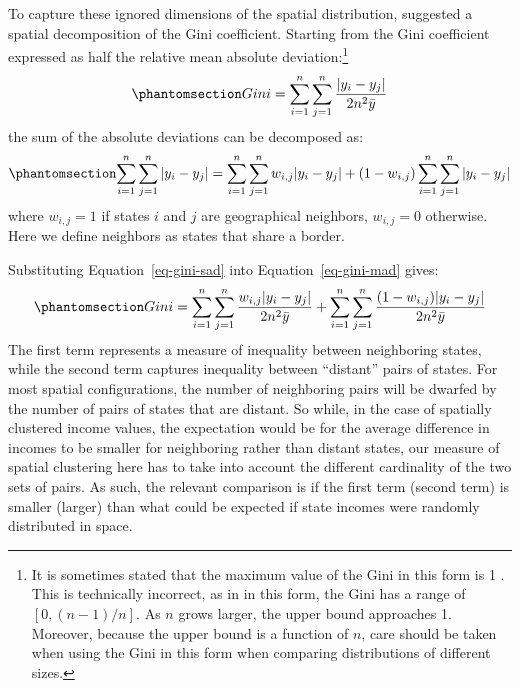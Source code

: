 \documentclass[
  a4paper, 
  twoside,
  final
]{article}
\begin{document}
To capture these ignored dimensions of the spatial distribution,
\citet{rey2013SpatialDecomposition} suggested a spatial decomposition of
the Gini coefficient. Starting from the Gini coefficient expressed as
half the relative mean absolute deviation:\footnote{It is sometimes
  stated that the maximum value of the Gini in this form is 1
  \citep[e.g.,][]{wang2024RobustMethod}. This is technically incorrect,
  as in in this form, the Gini has a range of \([0, (n-1)/n]\). As \(n\)
  grows larger, the upper bound approaches 1. Moreover, because the
  upper bound is a function of \(n\), care should be taken when using
  the Gini in this form when comparing distributions of different sizes.}
\begin{equation}\phantomsection\label{eq-gini-mad}{
Gini = \sum_{i=1}^n \sum_{j=1}^n \frac{|y_i - y_j|}{2n^2 \bar{y}}
}\end{equation} the sum of the absolute deviations can be decomposed as:
\begin{equation}\phantomsection\label{eq-gini-sad}{
\sum_{i=1}^n \sum_{j=1}^n |y_i - y_j| = \sum_{i=1}^n \sum_{j=1}^n w_{i,j} |y_i -
y_j| + (1-w_{i,j})\sum_{i=1}^n \sum_{j=1}^n |y_i - y_j|
}\end{equation} where \(w_{i,j} = 1\) if states \(i\) and \(j\) are
geographical neighbors, \(w_{i,j}=0\) otherwise. Here we define
neighbors as states that share a border.

Substituting Equation~\ref{eq-gini-sad} into Equation~\ref{eq-gini-mad}
gives: \begin{equation}\phantomsection\label{eq-gini-spatial}{
Gini = \sum_{i=1}^n \sum_{j=1}^n \frac{w_{i,j} |y_i - y_j|}{2n^2 \bar{y}} +
\sum_{i=1}^n \sum_{j=1}^n \frac{ (1-w_{i,j}) |y_i - y_j|}{2n^2 \bar{y}}
}\end{equation} The first term represents a measure of inequality
between neighboring states, while the second term captures inequality
between ``distant'' pairs of states. For most spatial configurations,
the number of neighboring pairs will be dwarfed by the number of pairs
of states that are distant. So while, in the case of spatially clustered
income values, the expectation would be for the average difference in
incomes to be smaller for neighboring rather than distant states, our
measure of spatial clustering here has to take into account the
different cardinality of the two sets of pairs. As such, the relevant
comparison is if the first term (second term) is smaller (larger) than
what could be expected if state incomes were randomly distributed in
space.
\end{document}
